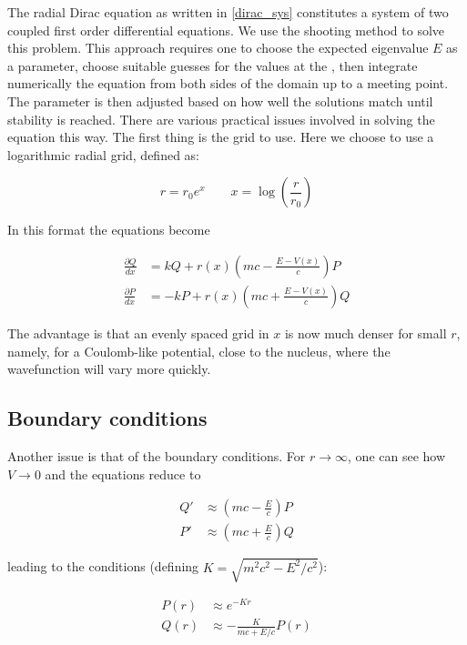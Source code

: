 \documentclass[]{report}
\begin{document}
The radial Dirac equation as written in \ref{dirac_sys} constitutes a system of two coupled first order differential equations. We use the shooting method to solve this problem. This approach requires one to choose the expected eigenvalue $E$ as a parameter, choose suitable guesses for the values at the 
, then integrate numerically the equation from both sides of the domain up to a meeting point. The parameter is then adjusted based on how well the solutions match until stability is reached.\newline
There are various practical issues involved in solving the equation this way. The first thing is the grid to use. Here we choose to use a logarithmic radial grid, defined as:

\begin{equation}
r = r_0e^x \qquad x = \log\left(\frac{r}{r_0}\right)
\end{equation}

In this format the equations become

\begin{align}\label{dirac_sys_log}
\frac{\partial Q}{dx} &= kQ + r(x)\left(mc-\frac{E-V(x)}{c}\right)P \\
\frac{\partial P}{dx} &= -kP + r(x)\left(mc+\frac{E-V(x)}{c}\right)Q
\end{align}

The advantage is that an evenly spaced grid in $x$ is now much denser for small $r$, namely, for a Coulomb-like potential, close to the nucleus, where the wavefunction will vary more quickly.

\subsection{Boundary conditions}
Another issue is that of the boundary conditions. For $r \rightarrow \infty$, one can see how $V \rightarrow 0$ and the equations reduce to \cite{silbar2010}

\begin{align}\label{dirac_sys_inf}
Q' &\approx \left(mc-\frac{E}{c}\right)P \\
P' &\approx \left(mc+\frac{E}{c}\right)Q
\end{align}

leading to the conditions (defining $K = \sqrt{m^2c^2-E^2/c^2}$):

\begin{align}
P(r) &\approx e^{-Kr} \\
Q(r) &\approx -\frac{K}{mc+E/c}P(r)
\end{align}
\end{document}
